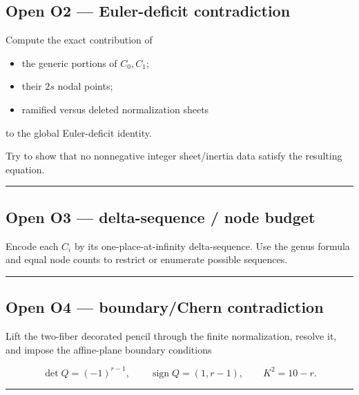 \subsection{Open O2 --- Euler-deficit
contradiction}\label{open-o2-euler-deficit-contradiction}

Compute the exact contribution of

\begin{itemize}
\tightlist
\item
  the generic portions of \(C_0,C_1\);
\item
  their \(2s\) nodal points;
\item
  ramified versus deleted normalization sheets
\end{itemize}

to the global Euler-deficit identity.

Try to show that no nonnegative integer sheet/inertia data satisfy the
resulting equation.

\begin{center}\rule{0.5\linewidth}{0.5pt}\end{center}

\subsection{Open O3 --- delta-sequence / node
budget}\label{open-o3-delta-sequence-node-budget}

Encode each \(C_i\) by its one-place-at-infinity delta-sequence. Use the
genus formula and equal node counts to restrict or enumerate possible
sequences.

\begin{center}\rule{0.5\linewidth}{0.5pt}\end{center}

\subsection{Open O4 --- boundary/Chern
contradiction}\label{open-o4-boundarychern-contradiction}

Lift the two-fiber decorated pencil through the finite normalization,
resolve it, and impose the affine-plane boundary conditions

\[
\det Q=(-1)^{r-1},
\qquad
\operatorname{sign}Q=(1,r-1),
\qquad
K^2=10-r.
\]

\begin{center}\rule{0.5\linewidth}{0.5pt}\end{center}

